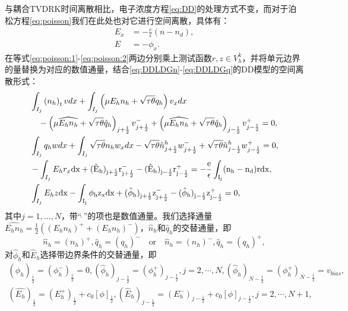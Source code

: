 与耦合TVDRK时间离散相比，电子浓度方程\eqref{eq:DD}的处理方式不变，而对于泊松方程\eqref{eq:poisson}我们在此处也对它进行空间离散，具体有：
\begin{align}
    E_x & = -\frac{e}{\epsilon}(n-n_d), \label{eq:poisson:1} \\
    E   & = - \phi_x. \label{eq:poisson:2}
\end{align}
在等式\eqref{eq:poisson:1}-\eqref{eq:poisson:2}两边分别乘上测试函数$r,z\in V^k_h$，并将单元边界的量替换为对应的数值通量，结合\eqref{eq:DDLDGn}-\eqref{eq:DDLDGq}的DD模型的空间离散形式：
\begin{align}
     & \int_{I_{j}}\left(n_h\right)_{t} v d x+\int_{I_{j}}\left(\mu E_h n_h+\sqrt{\tau \theta} q_h\right) v_{x} d x      \nonumber                                                                                                                       \\
     & \quad-\left(\mu \widehat{E_h n_h}+\sqrt{\tau \theta} \hat{q}_{h}\right)_{j+\frac{1}{2}} v_{j+\frac{1}{2}}^{-}+\left(\mu \widehat{E_h n_h}+\sqrt{\tau \theta} \hat{q}_{h}\right)_{j-\frac{1}{2}} v_{j-\frac{1}{2}}^{+}=0, \label{eq:IMEX:DD:n}     \\
     & \int_{I_{j}} q_h w d x+\int_{I_{j}} \sqrt{\tau \theta} n_h w_{x} d x-\sqrt{\tau \theta} \hat{n}_{j+\frac{1}{2}}^{h} w_{j+\frac{1}{2}}^{-}+\sqrt{\tau \theta} \hat{n}_{j-\frac{1}{2}}^{h} w_{j-\frac{1}{2}}^{+}=0,            \label{eq:IMEX:DD:q} \\
     & -\int_{I_j}E_hr_x\rm{d}x + (\hat{E}_h)_{j+\frac{1}{2}}r_{j+\frac{1}{2}}^- - (\hat{E}_h)_{j-\frac{1}{2}}r_{j-\frac{1}{2}}^+ = -\frac{e}{\epsilon}\int_{I_j}(n_h-n_d)r\rm{d}x,                                        \label{eq:IMEX:poisson:1}     \\
     & \int_{I_j} E_hz \rm{d}x - \int_{I_j}\phi_h z_x \rm{d}x + (\hat{\phi}_h)_{j+\frac{1}{2}}z_{j+\frac{1}{2}}^- - (\hat{\phi}_h)_{j-\frac{1}{2}}z_{j-\frac{1}{2}}^+ = 0,\label{eq:IMEX:poisson:2}
\end{align}
其中$j = 1,...,N$，带“$\widehat{\ }$”的项也是数值通量。我们选择通量$\widehat{E_h n_h} = \frac{1}{2}((E_hn_h)^+  + (E_hn_h)^-)$，$\hat{n}_h$和$\hat{q}_h$的交替通量，即
\begin{equation}
    \hat{n}_h = (n_h)^+, \hat{q}_h = (q_h)^- \quad \text{or} \quad \hat{n}_h = (n_h)^-, \hat{q}_h = (q_h)^+, \label{numbericalFlux:n&q}
\end{equation}
对$\hat{\phi}_h$和$\hat{E}_h$选择带边界条件的交替通量，即
\begin{equation}
    \begin{aligned}
        (\hat{\phi}_h)_{\frac{1}{2}} = (\phi_h^-)_{\frac{1}{2}} = 0, (\hat{\phi}_h)_{j-\frac{1}{2}} = (\phi_h^+)_{j-\frac{1}{2}},j = 2,\cdots,N,(\hat{\phi}_h)_{N-\frac{1}{2}} = (\phi_h^+)_{N-\frac{1}{2}} = v_{bias}, \\
        (\hat{E_h})_{\frac{1}{2}} = (E_h^+)_{\frac{1}{2}} + c_0[\phi]_{\frac{1}{2}}, (\hat{E}_h)_{j-\frac{1}{2}} = (E_h^-)_{j-\frac{1}{2}} + c_0[\phi]_{j-\frac{1}{2}},j = 2,\cdots,N+1,
    \end{aligned}\label{numbericalFlux:phi&E}
\end{equation}
